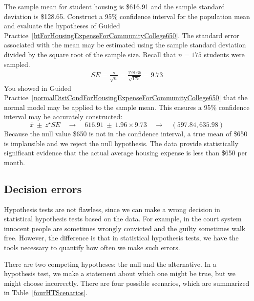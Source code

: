 \textC{\newpage}

\begin{example}{The sample mean for student housing is \$616.91 and the sample standard deviation is \$128.65. Construct a 95\% confidence interval for the population mean and evaluate the hypotheses of Guided Practice~\ref{htForHousingExpenseForCommunityCollege650}.}
The standard error associated with the mean may be estimated using the sample standard deviation divided by the square root of the sample size. Recall that $n = 175$ students were sampled.
\begin{align*}
SE = \frac{s}{\sqrt{n}} = \frac{128.65}{\sqrt{175}} = 9.73
\end{align*}
You showed in Guided Practice~\ref{normalDistCondForHousingExpenseForCommunityCollege650} that the normal model may be applied to the sample mean. This ensures a 95\% confidence interval may be accurately constructed:
$$\bar{x}\ \pm\ z^{\star} SE \quad\to\quad 616.91\ \pm\ 1.96 \times 9.73 \quad \to \quad (597.84, 635.98) $$
Because the null value \$650 is not in the confidence interval, a true mean of \$650 is implausible and we reject the null hypothesis. The data provide statistically significant evidence that the actual average housing expense is less than \$650 per month.
\end{example}


\subsection{Decision errors}


Hypothesis tests are not flawless, since we can make a wrong decision in statistical hypothesis tests based on the data. For example, in the court system innocent people are sometimes wrongly convicted and the guilty sometimes walk free. However, the difference is that in statistical hypothesis tests, we have the tools necessary to quantify how often we make such errors.


There are two competing hypotheses: the null and the alternative. In a hypothesis test, we make a statement about which one might be true, but we might choose incorrectly. There are four possible scenarios, which are summarized in Table~\ref{fourHTScenarios}.

